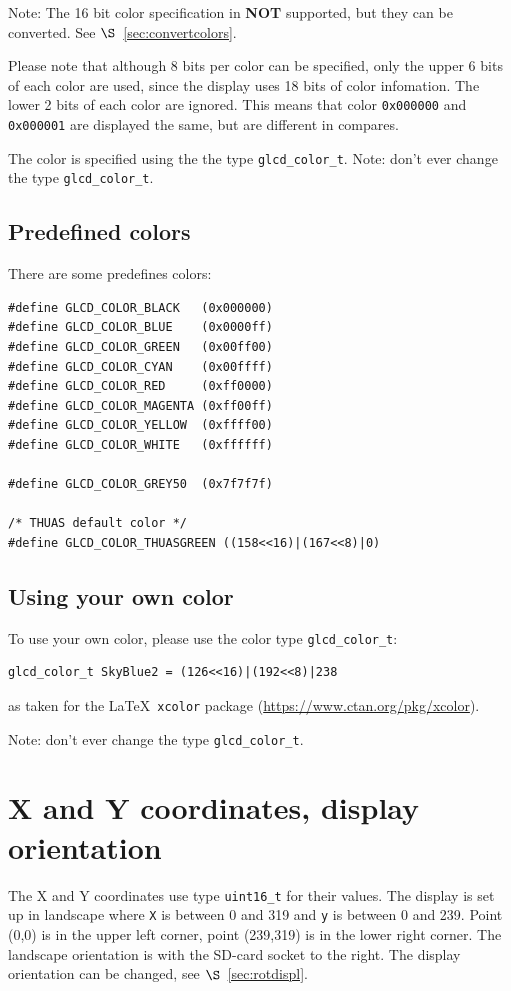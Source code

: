 \documentclass[12pt]{article}
\begin{document}
Note: The 16 bit color specification in \textbf{NOT} supported, but they can be converted. See $\S$~\ref{sec:convertcolors}.

Please note that although 8 bits per color can be specified, only the upper 6 bits of each color are used, since the display uses 18 bits of color infomation. The lower 2 bits of each color are ignored. This means that color \lstinline|0x000000| and \lstinline|0x000001| are displayed the same, but are different in compares.

The color is specified using the the type \lstinline|glcd_color_t|. Note: don't ever change the type \lstinline|glcd_color_t|.

\subsection{Predefined colors}
There are some predefines colors:

\begin{lstlisting}
#define GLCD_COLOR_BLACK   (0x000000)
#define GLCD_COLOR_BLUE    (0x0000ff)
#define GLCD_COLOR_GREEN   (0x00ff00)
#define GLCD_COLOR_CYAN    (0x00ffff)
#define GLCD_COLOR_RED     (0xff0000)
#define GLCD_COLOR_MAGENTA (0xff00ff)
#define GLCD_COLOR_YELLOW  (0xffff00)
#define GLCD_COLOR_WHITE   (0xffffff)

#define GLCD_COLOR_GREY50  (0x7f7f7f)

/* THUAS default color */
#define GLCD_COLOR_THUASGREEN ((158<<16)|(167<<8)|0)
\end{lstlisting}

\subsection{Using your own color}
To use your own color, please use the color type \lstinline|glcd_color_t|:

\begin{lstlisting}
glcd_color_t SkyBlue2 = (126<<16)|(192<<8)|238
\end{lstlisting}

as taken for the \LaTeX\ \lstinline|xcolor| package (\url{https://www.ctan.org/pkg/xcolor}).

Note: don't ever change the type \lstinline|glcd_color_t|.


\section{X and Y coordinates, display orientation}
The X and Y coordinates use type \lstinline|uint16_t| for their values. The display is set up in landscape where \lstinline|X| is between 0 and 319 and \lstinline|y| is between 0 and 239. Point (0,0) is in the upper left corner,
point (239,319) is in the lower right corner. The landscape orientation is with the SD-card socket to the right.
The display orientation can be changed, see $\S$~\ref{sec:rotdispl}.
\end{document}
